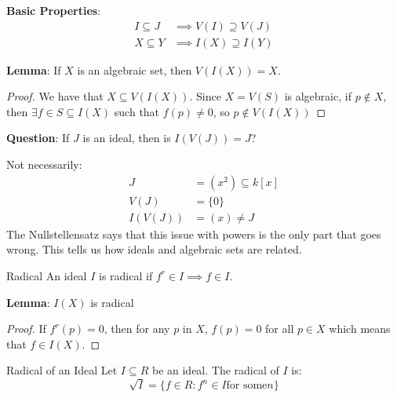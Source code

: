 \documentclass{report}
\begin{document}
\textbf{Basic Properties}:
    \begin{align*}
        I \subseteq J &\implies  V(I) \supseteq V(J) \\
        X \subseteq Y &\implies  I(X) \supseteq I(Y)   
    \end{align*}

\textbf{Lemma}: If $X$ is an algebraic set, then $V(I(X)) = X$. 
    \begin{proof}
        We have that $X \subseteq V(I(X))$. Since $X = V(S)$ is algebraic, if $p \notin X$, then $\exists f \in S \subseteq I(X)$ such that $f(p) \neq 0$, so $p \notin V(I(X))$
    \end{proof}

\textbf{Question}: If $J$ is an ideal, then is $I(V(J)) = J$?
    \begin{examples}
        \begin{example}
            Not necessarily:
                \begin{align*}
                    J       &= (x^{2}) \subseteq k[x] \\
                    V(J)    &= \{0\}                  \\
                    I(V(J)) &= (x) \neq J               
                \end{align*}
            The Nullstellensatz says that this issue with powers is the only part that goes wrong. This tells us how ideals and algebraic sets are related.
        \end{example}
    \end{examples}

\begin{definition}{Radical}
    An ideal $I$ is radical if $f^{r} \in I \implies f \in I$.
\end{definition}

\textbf{Lemma}: $I(X)$ is radical
    \begin{proof}
        If $f^{r}(p) = 0$, then for any $p$ in $X$, $f(p) = 0$ for all $p \in X$ which means that $f \in I(X)$.
    \end{proof}

\begin{definition}{Radical of an Ideal}
    Let $I \subseteq R$ be an ideal. The radical of $I$ is:
        \begin{equation*}
            \sqrt{I} = \{f \in R : f^{n} \in I \text{for some} n\}
        \end{equation*}
\end{definition}
\end{document}
